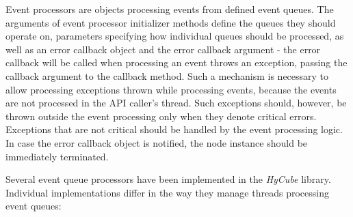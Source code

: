 Event processors are objects processing events from defined event queues. The arguments of event processor initializer methods define the queues they should operate on, parameters specifying how individual queues should be processed, as well as an error callback object and the error callback argument - the error callback will be called when processing an event throws an exception, passing the callback argument to the callback method. Such a mechanism is necessary to allow processing exceptions thrown while processing events, because the events are not processed in the API caller's thread. Such exceptions should, however, be thrown outside the event processing only when they denote critical errors. Exceptions that are not critical should be handled by the event processing logic. In case the error callback object is notified, the node instance should be immediately terminated.

Several event queue processors have been implemented in the \emph{HyCube} library. Individual implementations differ in the way they manage threads processing event queues:


